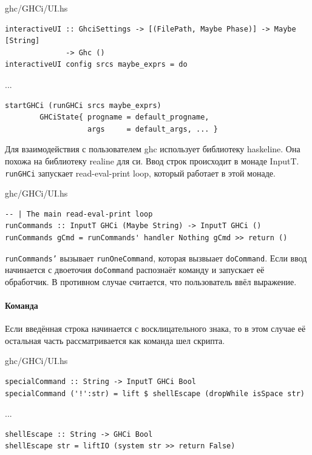 \documentclass[fontsize=14pt, paper=a4, pagesize, DIV=calc]{scrartcl}
\def\code#1{\texttt{#1}}
\begin{document}
\begin{ListingEnv}
\caption{ghc/GHCi/UI.hs}
\begin{lstlisting}[firstnumber=400]
interactiveUI :: GhciSettings -> [(FilePath, Maybe Phase)] -> Maybe [String]
              -> Ghc ()
interactiveUI config srcs maybe_exprs = do
\end{lstlisting}
...
\begin{lstlisting}[firstnumber=454]
    startGHCi (runGHCi srcs maybe_exprs)
        GHCiState{ progname = default_progname,
                   args     = default_args, ... }
\end{lstlisting}
\end{ListingEnv}

Для взаимодействия с пользователем ghc использует библиотеку haskeline. Она
похожа на библиотеку realine для си. Ввод строк происходит в монаде InputT.
\code{runGHCi} запускает read-eval-print loop, который работает в этой монаде.

\begin{ListingEnv}
\caption{ghc/GHCi/UI.hs}
\begin{lstlisting}[firstnumber=892]
-- | The main read-eval-print loop
runCommands :: InputT GHCi (Maybe String) -> InputT GHCi ()
runCommands gCmd = runCommands' handler Nothing gCmd >> return ()
\end{lstlisting}
\end{ListingEnv}

\code{runCommands'} вызывает \code{runOneCommand}, которая вызвыает
\code{doCommand}. Если ввод начинается с двоеточия \code{doCommand} распознаёт
команду и запускает её обработчик. В противном случае считается, что
пользователь ввёл выражение.

\paragraph{Команда}

Если введённая строка начинается с восклицательного знака, то в этом случае её
остальная часть рассматривается как команда шел скрипта.

\begin{ListingEnv}
\caption{ghc/GHCi/UI.hs}
\begin{lstlisting}[firstnumber=1204]
specialCommand :: String -> InputT GHCi Bool
specialCommand ('!':str) = lift $ shellEscape (dropWhile isSpace str)
\end{lstlisting}
...
\begin{lstlisting}[firstnumber=1221]
shellEscape :: String -> GHCi Bool
shellEscape str = liftIO (system str >> return False)
\end{lstlisting}
\end{ListingEnv}
\end{document}
